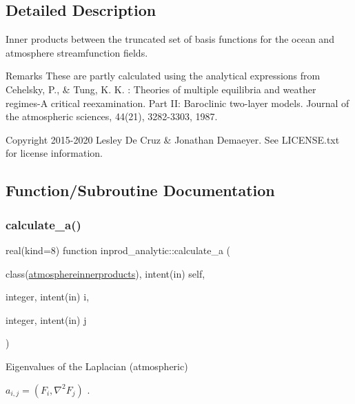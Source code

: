 \subsection{Detailed Description}
Inner products between the truncated set of basis functions for the ocean and atmosphere streamfunction fields. 

\begin{DoxyRemark}{Remarks}
These are partly calculated using the analytical expressions from Cehelsky, P., \& Tung, K. K. \+: Theories of multiple equilibria and weather regimes-\/A critical reexamination. Part II\+: Baroclinic two-\/layer models. Journal of the atmospheric sciences, 44(21), 3282-\/3303, 1987. 
\end{DoxyRemark}
\begin{DoxyCopyright}{Copyright}
2015-\/2020 Lesley De Cruz \& Jonathan Demaeyer. See L\+I\+C\+E\+N\+S\+E.\+txt for license information. 
\end{DoxyCopyright}


\subsection{Function/\+Subroutine Documentation}
\mbox{\label{namespaceinprod__analytic_a64153fea3801b0768d3b5122da23b324}} 
\subsubsection{\texorpdfstring{calculate\+\_\+a()}{calculate\_a()}}
{\footnotesize\ttfamily real(kind=8) function inprod\+\_\+analytic\+::calculate\+\_\+a (\begin{DoxyParamCaption}\item[{class(\hyperlink{structinprod__analytic_1_1atmosphereinnerproducts}{atmosphereinnerproducts}), intent(in)}]{self,  }\item[{integer, intent(in)}]{i,  }\item[{integer, intent(in)}]{j }\end{DoxyParamCaption})\hspace{0.3cm}{\ttfamily [private]}}



Eigenvalues of the Laplacian (atmospheric) 

$ a_{i,j} = (F_i, \nabla^2 F_j)$ . 

